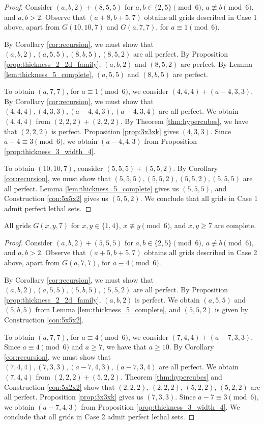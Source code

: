 \begin{proof}
Consider $(a,b,2) + (8,5,5)$ for $a,b \in \{2,5\} \pmod 6$, $a \not\equiv b \pmod 6$, and $a,b > 2$. Observe that $(a+8,b+5,7)$ obtains all grids described in Case 1 above, apart from $G(10,10,7)$ and $G(a, 7,7)$, for $a \equiv 1 \pmod 6$. 

By Corollary \ref{cor:recursion}, we must show that $(a,b,2), (a,5,5), (8,b,5), (8,5,2)$ are all perfect. By Proposition \ref{prop:thickness_2_2d_family}, $(a,b,2)$ and $(8,5,2)$ are perfect. By Lemma \ref{lem:thickness_5_complete}, $(a,5,5)$ and $(8,b,5)$ are perfect. 

To obtain $(a,7,7)$, for $a \equiv 1 \pmod 6$, we consider $(4,4,4) + (a-4,3,3)$. By Corollary \ref{cor:recursion}, we must show that $(4,4,4), (4,3,3), (a-4,4,3), (a-4,3,4)$ are all perfect. We obtain $(4,4,4)$ from $(2,2,2)+(2,2,2)$. By Theorem \ref{thm:hypercubes}, we have that $(2,2,2)$ is perfect. Proposition \ref{prop:3x3xk} gives $(4,3,3)$. Since $a-4 \equiv 3 \pmod 6$, we obtain $(a-4,4,3)$ from Proposition \ref{prop:thickness_3_width_4}.

To obtain $(10,10,7)$, consider $(5,5,5) + (5,5,2)$. By Corollary \ref{cor:recursion}, we must show that $(5,5,5), (5,5,2), (5,5,2), (5,5,5)$ are all perfect. Lemma \ref{lem:thickness_5_complete} gives us $(5,5,5)$, and Construction \ref{con:5x5x2} gives us $(5,5,2)$. We conclude that all grids in Case 1 admit perfect lethal sets. 
\end{proof}

\begin{lem}
\label{lem:thickness_7_case_2}
All grids $G(x,y,7)$ for $x,y \in \{1,4\}$, $x \not\equiv y \pmod 6$, and $x,y \geq 7$ are complete.
\end{lem}

\begin{proof}
Consider $(a,b,2) + (5,5,5)$ for $a,b \in \{2,5\} \pmod 6$, $a \not\equiv b \pmod 6$, and $a,b > 2$. Observe that $(a+5,b+5,7)$ obtains all grids described in Case 2 above, apart from $G(a,7,7)$, for $a \equiv 4 \pmod 6$. 

By Corollary \ref{cor:recursion}, we must show that $(a,b,2), (a,5,5), (5,b,5), (5,5,2)$ are all perfect. By Proposition \ref{prop:thickness_2_2d_family}, $(a,b,2)$ is perfect. We obtain $(a,5,5)$ and $(5,b,5)$ from Lemma \ref{lem:thickness_5_complete}, and $(5,5,2)$ is given by Construction \ref{con:5x5x2}.

To obtain $(a,7,7)$, for $a \equiv 4 \pmod 6$, we consider $(7,4,4) + (a-7,3,3)$. Since $a \equiv 4 \pmod 6$ and $a \geq 7$, we have that $a \geq 10$. By Corollary \ref{cor:recursion}, we must show that $(7,4,4), (7,3,3), (a-7,4,3), (a-7,3,4)$ are all perfect. We obtain $(7,4,4)$ from $(2,2,2) + (5,2,2)$. Theorem \ref{thm:hypercubes} and Construction \ref{con:5x2x2} show that $(2,2,2)$, $(2,2,2)$, $(5,2,2)$, $(5,2,2)$ are all perfect. Proposition \ref{prop:3x3xk} gives us $(7,3,3)$. Since $a-7 \equiv 3 \pmod 6$, we obtain $(a-7,4,3)$ from Proposition \ref{prop:thickness_3_width_4}. We conclude that all grids in Case 2 admit perfect lethal sets. 
\end{proof}

